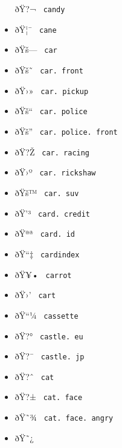 \begin{itemize}
  \label{symbol-candy}{{ ðŸ?¬ } \texttt{\ candy\ }}
\item
  \label{symbol-cane}{{ ðŸ¦¯ } \texttt{\ cane\ }}
\item
  \label{symbol-car}{{ ðŸš--- } \texttt{\ car\ }}
\item
  \label{symbol-car.front}{{ ðŸš˜ }
  \texttt{\ car.\ front\ }}
\item
  \label{symbol-car.pickup}{{ ðŸ›» }
  \texttt{\ car.\ pickup\ }}
\item
  \label{symbol-car.police}{{ ðŸš`` }
  \texttt{\ car.\ police\ }}
\item
  \label{symbol-car.police.front}{{ ðŸš'' }
  \texttt{\ car.\ police.\ front\ }}
\item
  \label{symbol-car.racing}{{ ðŸ?Ž }
  \texttt{\ car.\ racing\ }}
\item
  \label{symbol-car.rickshaw}{{ ðŸ›º }
  \texttt{\ car.\ rickshaw\ }}
\item
  \label{symbol-car.suv}{{ ðŸš™ } \texttt{\ car.\ suv\ }}
\item
  \label{symbol-card.credit}{{ ðŸ'³ }
  \texttt{\ card.\ credit\ }}
\item
  \label{symbol-card.id}{{ ðŸªª } \texttt{\ card.\ id\ }}
\item
  \label{symbol-cardindex}{{ ðŸ``‡ }
  \texttt{\ cardindex\ }}
\item
  \label{symbol-carrot}{{ ðŸ¥• } \texttt{\ carrot\ }}
\item
  \label{symbol-cart}{{ ðŸ›' } \texttt{\ cart\ }}
\item
  \label{symbol-cassette}{{ ðŸ``¼ }
  \texttt{\ cassette\ }}
\item
  \label{symbol-castle.eu}{{ ðŸ?° }
  \texttt{\ castle.\ eu\ }}
\item
  \label{symbol-castle.jp}{{ ðŸ?¯ }
  \texttt{\ castle.\ jp\ }}
\item
  \label{symbol-cat}{{ ðŸ?ˆ } \texttt{\ cat\ }}
\item
  \label{symbol-cat.face}{{ ðŸ?± }
  \texttt{\ cat.\ face\ }}
\item
  \label{symbol-cat.face.angry}{{ ðŸ˜¾ }
  \texttt{\ cat.\ face.\ angry\ }}
\item
  \label{symbol-cat.face.cry}{{ ðŸ˜¿ }
}
\end{itemize}
